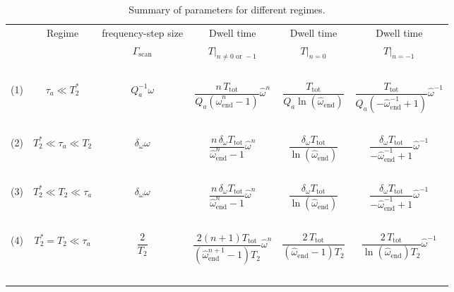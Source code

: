 \documentclass{WileyMSP-template}
\begin{document}
	
	\begin{table}[ht]
		\centering
		\caption{Summary of parameters for different regimes.} 
		\begin{tabular}{cccccc}
			\hline
			\, & Regime & frequency-step size &  Dwell time  &  Dwell time  &  Dwell time   \\
			\, &  & $\Gamma_{\mathrm{scan}}$ & $T|_{n\ne0 \text{ or } -1}$ & $T|_{n=0}$ & $T|_{n=-1}$ \\
			\hline
			\, & &   &  &   &   \\
			(1) & $\tau_a \ll T_2^*$ & $Q_a^{-1}\omega$ 
			& $\dfrac{n \,T_{\mathrm{tot}} }{ Q_a (\hat{\omega}_{\mathrm{end}}^{n}-1) } \hat{\omega}^n$ 
			& $\dfrac{T_{\mathrm{tot}} }{ Q_a \ln(\hat{\omega}_{\mathrm{end}}) } $
			& $\dfrac{T_{\mathrm{tot}} }{ Q_a (-\hat{\omega}_{\mathrm{end}}^{-1}+1) } \hat{\omega}^{-1}$\\
			\, & &   &  &   &   \\
			(2) & $T_2^* \ll \tau_a \ll T_2$  & $\delta_\omega \omega$ 
			& $\dfrac{n \,\delta_{\omega} T_{\mathrm{tot}} }{ \hat{\omega}_{\mathrm{end}}^{n}-1 } \hat{\omega}^n$ 
			& $\dfrac{\delta_{\omega} T_{\mathrm{tot}} }{  \ln(\hat{\omega}_{\mathrm{end}}) } $
			& $\dfrac{\delta_{\omega} T_{\mathrm{tot}} }{  -\hat{\omega}_{\mathrm{end}}^{-1}+1 } \hat{\omega}^{-1}$  \\
			\, & &   &  &   &   \\
			(3) & $T_2^* \ll T_2 \ll \tau_a$ & $\delta_\omega \omega$
			& $\dfrac{n \,\delta_{\omega} T_{\mathrm{tot}} }{ \hat{\omega}_{\mathrm{end}}^{n}-1 } \hat{\omega}^n$ 
			& $\dfrac{\delta_{\omega} T_{\mathrm{tot}} }{  \ln(\hat{\omega}_{\mathrm{end}}) } $
			& $\dfrac{\delta_{\omega} T_{\mathrm{tot}} }{  -\hat{\omega}_{\mathrm{end}}^{-1}+1 } \hat{\omega}^{-1}$\\
			\, & &   &  &   &   \\
			(4) & $T_2^*=T_2 \ll \tau_a$ & $\dfrac{2}{T_2}$ 
			& $\dfrac{2(n+1) T_{\mathrm{tot}}}{(\hat{\omega}_{\mathrm{end}}^{n+1}-1) T_2} \hat{\omega}^n$ 
			& $\dfrac{2\,T_{\mathrm{tot}}}{(\hat{\omega}_{\mathrm{end}}-1) T_2  }$ 
			& $ \dfrac{2\,T_{\mathrm{tot}}}{\ln{(\hat{\omega}_{\mathrm{end}})} T_2}   \hat{\omega}^{-1}      $ \\
			\, & &   &  &   &   \\
			\hline
		\end{tabular}
		\label{tab:summary_of_scanning}
	\end{table}
\end{document}
